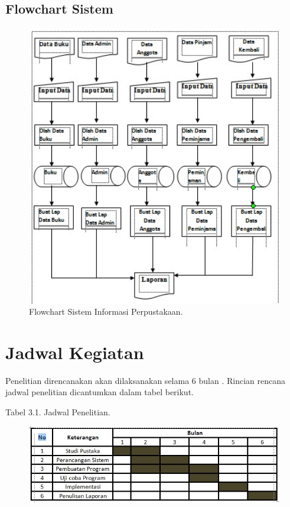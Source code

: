 \documentclass{jtetiproposalskripsi}
\begin{document}
\subsection{Flowchart Sistem}
\begin{figure}[ht!]
\centering
	\includegraphics[width=1\textwidth]{gambar/Flowchart}
	\caption{Flowchart Sistem Informasi Perpustakaan.}
	\label{Flowchart}
\end{figure}
\newpage

\section{Jadwal Kegiatan}
Penelitian direncanakan akan dilaksanakan selama 6 bulan . Rincian rencana jadwal penelitian dicantumkan dalam tabel berikut.

\begin{center}
Tabel 3.1. Jadwal Penelitian.
\end{center}
\vspace{-0.5cm}
\begin{figure}[ht!]
  \centering
    \includegraphics[width=1\textwidth]{gambar/JK}
\end{figure}
\end{document}
